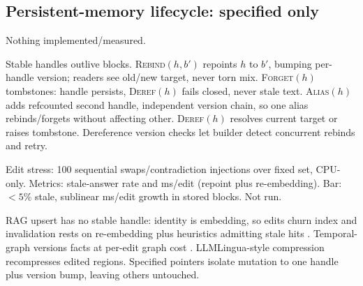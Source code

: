 \label{sec:life}
\subsection{Persistent-memory lifecycle: specified only}
Nothing implemented/measured.

Stable handles outlive blocks. \textsc{Rebind}$(h, b')$ repoints $h$ to $b'$, bumping per-handle version; readers see old/new target, never torn mix. \textsc{Forget}$(h)$ tombstones: handle persists, \textsc{Deref}$(h)$ fails closed, never stale text. \textsc{Alias}$(h)$ adds refcounted second handle, independent version chain, so one alias rebinds/forgets without affecting other. \textsc{Deref}$(h)$ resolves current target or raises tombstone. Dereference version checks let builder detect concurrent rebinds and retry.

Edit stress: 100 sequential swaps/contradiction injections over fixed set, CPU-only. Metrics: stale-answer rate and ms/edit (repoint plus re-embedding). Bar: $<5\%$ stale, sublinear ms/edit growth in stored blocks. Not run.

RAG upsert has no stable handle: identity is embedding, so edits churn index and invalidation rests on re-embedding plus heuristics admitting stale hits \cite{chhikara2025mem0}. Temporal-graph versions facts at per-edit graph cost \cite{rasmussen2025zep}. LLMLingua-style compression recompresses edited regions. Specified pointers isolate mutation to one handle plus version bump, leaving others untouched.
